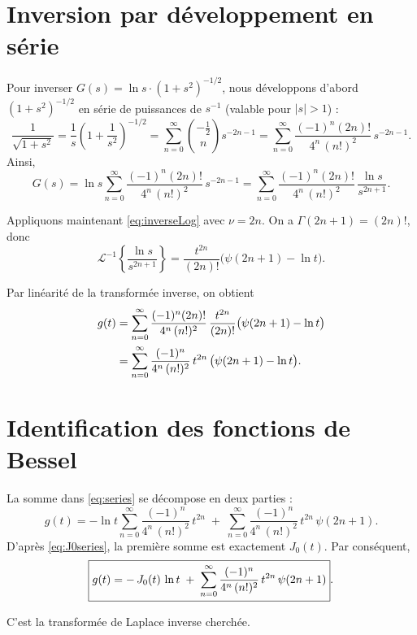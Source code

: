 \documentclass[12pt,a4paper]{article}
\begin{document}
\section{Inversion par développement en série}
Pour inverser \(G(s) = \ln s \cdot (1+s^2)^{-1/2}\), nous développons d'abord \((1+s^2)^{-1/2}\) en série de puissances de \(s^{-1}\) (valable pour \(|s|>1\)) :
\[
\frac{1}{\sqrt{1+s^2}}
= \frac{1}{s}\left(1+\frac{1}{s^2}\right)^{-1/2}
= \sum_{n=0}^{\infty} \binom{-\frac12}{n} s^{-2n-1}
= \sum_{n=0}^{\infty} \frac{(-1)^n (2n)!}{4^n\,(n!)^2}\, s^{-2n-1}.
\]
Ainsi,
\[
G(s) = \ln s \sum_{n=0}^{\infty} \frac{(-1)^n (2n)!}{4^n\,(n!)^2}\, s^{-2n-1}
= \sum_{n=0}^{\infty} \frac{(-1)^n (2n)!}{4^n\,(n!)^2}\,
\frac{\ln s}{s^{2n+1}}.
\]

Appliquons maintenant \eqref{eq:inverseLog} avec \(\nu = 2n\). On a \(\Gamma(2n+1) = (2n)!\), donc
\[
\mathcal{L}^{-1}\!\left\{ \frac{\ln s}{s^{2n+1}} \right\}
= \frac{t^{2n}}{(2n)!}\bigl(\psi(2n+1) - \ln t\bigr).
\]

Par linéarité de la transformée inverse, on obtient
\begin{align}
g(t) &= \sum_{n=0}^{\infty} \frac{(-1)^n (2n)!}{4^n\,(n!)^2}\,
\frac{t^{2n}}{(2n)!}\bigl(\psi(2n+1) - \ln t\bigr) \notag\\
&= \sum_{n=0}^{\infty} \frac{(-1)^n}{4^n\,(n!)^2}\, t^{2n}\,
\bigl(\psi(2n+1) - \ln t\bigr). \label{eq:series}
\end{align}

\section{Identification des fonctions de Bessel}
La somme dans \eqref{eq:series} se décompose en deux parties :
\[
g(t) = - \ln t \sum_{n=0}^{\infty} \frac{(-1)^n}{4^n\,(n!)^2}\, t^{2n}
\;+\; \sum_{n=0}^{\infty} \frac{(-1)^n}{4^n\,(n!)^2}\, t^{2n}\,\psi(2n+1).
\]
D'après \eqref{eq:J0series}, la première somme est exactement \(J_0(t)\).
Par conséquent,
\[
\boxed{%
g(t) = -\,J_0(t)\,\ln t \;+\; \sum_{n=0}^{\infty} \frac{(-1)^n}{4^n\,(n!)^2}\,
t^{2n}\,\psi(2n+1)
}. \label{eq:final}
\]

C'est la transformée de Laplace inverse cherchée.
\end{document}
